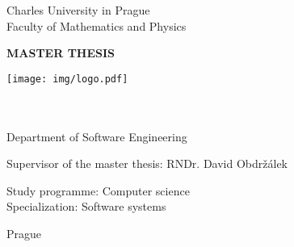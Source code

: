 \begin{titlingpage}
\begin{center}

\vspace{15mm}

\large
Charles University in Prague\\
Faculty of Mathematics and Physics\\

\vspace{10mm}

{\Large\textbf{MASTER THESIS}}

\vspace{20mm}

\texttt{[image: img/logo.pdf]} 

\vspace{20mm}

{\Large\theauthor}\\
\vspace{5mm}
{\Large\textbf{\thetitle}}\\
\vspace{5mm}
Department of Software Engineering\\
\vspace{20mm}

\large
\noindent Supervisor of the master thesis: RNDr. David Obdržálek
\vspace{1mm} 

\noindent Study programme: Computer science \\
Specialization: Software systems

\vspace{20mm}

Prague \the\year
\end{center}

\end{titlingpage}

\cleartorecto


